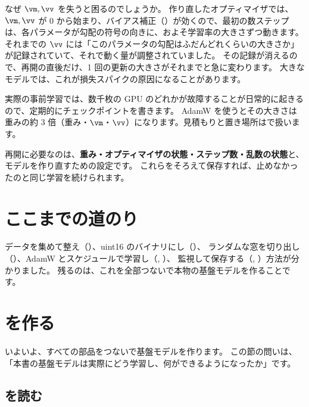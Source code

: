 なぜ $\vm,\vv$ を失うと困るのでしょうか。
作り直したオプティマイザでは、$\vm,\vv$ が 0 から始まり、バイアス補正（）が効くので、最初の数ステップは、各パラメータが勾配の符号の向きに、およそ学習率の大きさずつ動きます。
それまでの $\vv$ には「このパラメータの勾配はふだんどれくらいの大きさか」が記録されていて、それで動く量が調整されていました。
その記録が消えるので、再開の直後だけ、1 回の更新の大きさがそれまでと急に変わります。
大きなモデルでは、これが損失スパイクの原因になることがあります。

実際の事前学習では、数千枚の GPU のどれかが故障することが日常的に起きるので、定期的にチェックポイントを書きます。
AdamW を使うとその大きさは重みの約 3 倍（重み・$\vm$・$\vv$）になります。見積もりと置き場所はで扱います。

再開に必要なのは、\textbf{重み・オプティマイザの状態・ステップ数・乱数の状態}と、モデルを作り直すための設定です。
これらをそろえて保存すれば、止めなかったのと同じ学習を続けられます。

\section*{ここまでの道のり}

データを集めて整え（）、uint16 のバイナリにし（）、
ランダムな窓を切り出し（）、AdamW とスケジュールで学習し（, ）、
監視して保存する（, ）方法が分かりました。
残るのは、これを全部つないで本物の基盤モデルを作ることです。

\section{ を作る}\label{sec:pt-base}

いよいよ、すべての部品をつないで基盤モデルを作ります。
この節の問いは、「本書の基盤モデルは実際にどう学習し、何ができるようになったか」です。

\subsection{ を読む}


